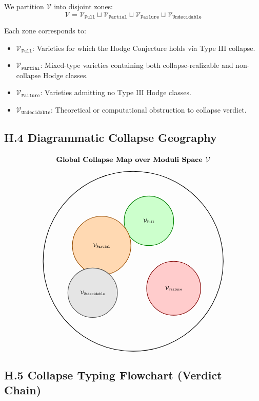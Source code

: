 \documentclass[11pt]{article}
\begin{document}
We partition $\mathcal{V}$ into disjoint zones:
\[
\mathcal{V} = \mathcal{V}_{\texttt{Full}} \sqcup \mathcal{V}_{\texttt{Partial}} \sqcup \mathcal{V}_{\texttt{Failure}} \sqcup \mathcal{V}_{\texttt{Undecidable}}
\]

Each zone corresponds to:

\begin{itemize}
  \item $\mathcal{V}_{\texttt{Full}}$: Varieties for which the Hodge Conjecture holds via Type III collapse.
  \item $\mathcal{V}_{\texttt{Partial}}$: Mixed-type varieties containing both collapse-realizable and non-collapse Hodge classes.
  \item $\mathcal{V}_{\texttt{Failure}}$: Varieties admitting no Type III Hodge classes.
  \item $\mathcal{V}_{\texttt{Undecidable}}$: Theoretical or computational obstruction to collapse verdict.
\end{itemize}

\subsection*{H.4 Diagrammatic Collapse Geography}

\[
\begin{tikzpicture}[scale=1.1]
\draw[thick] (0,0) circle (4);

\filldraw[fill=green!20, draw=green!50!black, thick] (0.7,1.8) circle (1.1cm);
\node at (0.7,1.8) {\scriptsize $\mathcal{V}_{\texttt{Full}}$};

\filldraw[fill=orange!30, draw=orange!60!black, thick] (-1.4,0.7) circle (1.3cm);
\node at (-1.4,0.7) {\scriptsize $\mathcal{V}_{\texttt{Partial}}$};

\filldraw[fill=red!20, draw=red!50!black, thick] (1.8,-1.2) circle (1.2cm);
\node at (1.8,-1.2) {\scriptsize $\mathcal{V}_{\texttt{Failure}}$};

\filldraw[fill=gray!20, draw=gray!60!black, thick] (-1.8,-1.4) circle (1.1cm);
\node at (-1.8,-1.4) {\scriptsize $\mathcal{V}_{\texttt{Undecidable}}$};

\node at (0,4.5) {\textbf{Global Collapse Map over Moduli Space $\mathcal{V}$}};
\end{tikzpicture}
\]

\subsection*{H.5 Collapse Typing Flowchart (Verdict Chain)}
\end{document}
